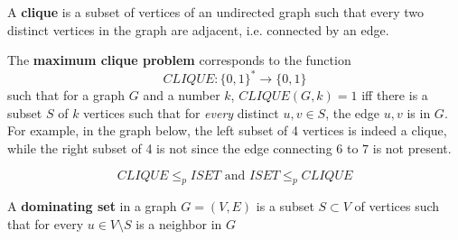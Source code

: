   \begin{definition}[Clique]
    \label{def:clique}
  A \textbf{clique} is a subset of vertices of an undirected graph such that every two distinct vertices in the graph are adjacent, i.e. connected by an edge. 

  The \textbf{maximum clique problem} corresponds to the function 
  \begin{equation}
    CLIQUE: \{0,1\}^* \to \{0,1\}
  \end{equation}
  such that for a graph $G$ and a number $k$, $CLIQUE(G, k) = 1$ iff there is a subset $S$ of $k$ vertices such that for \textit{every} distinct $u, v \in S$, the edge $u, v$ is in $G$. For example, in the graph below, the left subset of 4 vertices is indeed a clique, while the right subset of 4 is not since the edge connecting $6$ to $7$ is not present. 
  \begin{center}
  \end{center}
  \end{definition}

  \begin{theorem}
    \label{thm:equivalence-of-clique-and-iset}
  \begin{equation}
    CLIQUE \leq_p ISET \text{ and } ISET \leq_p CLIQUE
  \end{equation}
  \end{theorem}

  \begin{definition}
    \label{def:dominating-set}
  A \textbf{dominating set} in a graph $G = (V, E)$ is a subset $S \subset V$ of vertices such that for every $u \in V \setminus S$ is a neighbor in $G$ 
  \end{definition}

